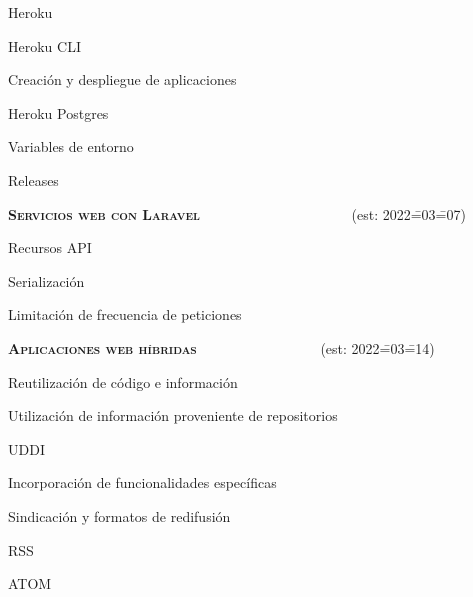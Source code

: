 \begin{longenum}
\begin{longenum}
        \item Heroku
        \begin{longenum}
            \item Heroku CLI
            \item Creación y despliegue de aplicaciones
            \item Heroku Postgres
            \item Variables de entorno
            \item Releases
        \end{longenum}
    \end{longenum}
    \item \textbf{\textsc{Servicios web con Laravel}} \ \ \ \ \ \ \ \ \ \ \ \ \ \ \ \ \ \ \ \ \ (est: 2022\==03\==07)
    \begin{longenum}
        \item Recursos API
        \item Serialización
        \item Limitación de frecuencia de peticiones
    \end{longenum}
    \item \textbf{\textsc{Aplicaciones web híbridas}} \ \ \ \ \ \ \ \ \ \ \ \ \ \ \ \ \ (est: 2022\==03\==14)
    \begin{longenum}
        \item Reutilización de código e información
        \item Utilización de información proveniente de repositorios
        \begin{longenum}
            \item UDDI
        \end{longenum}
        \item Incorporación de funcionalidades específicas
        \item Sindicación y formatos de redifusión
        \begin{longenum}
            \item RSS
            \item ATOM
        \end{longenum}
    \end{longenum}
\end{longenum}

